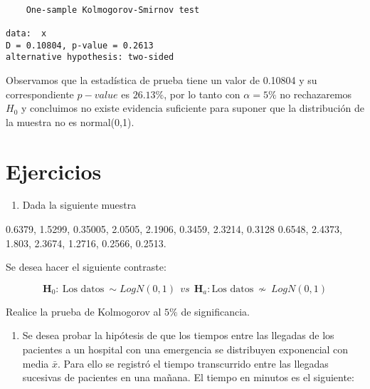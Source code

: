 \documentclass[
  a4paper,
  oneside,
  openany]{book}
\newenvironment{Shaded}{\begin{snugshade}}{\end{snugshade}}
\newcommand{\DecValTok}[1]{\textcolor[rgb]{0.00,0.00,0.81}{#1}}
\newcommand{\FunctionTok}[1]{\textcolor[rgb]{0.00,0.00,0.00}{#1}}
\newcommand{\NormalTok}[1]{#1}
\newcommand{\OtherTok}[1]{\textcolor[rgb]{0.56,0.35,0.01}{#1}}
\newcommand{\SpecialCharTok}[1]{\textcolor[rgb]{0.00,0.00,0.00}{#1}}
\newcommand{\StringTok}[1]{\textcolor[rgb]{0.31,0.60,0.02}{#1}}
\providecommand{\tightlist}{%
  \setlength{\itemsep}{0pt}\setlength{\parskip}{0pt}}
\begin{document}
\begin{Shaded}
\end{Shaded}

\begin{verbatim}

    One-sample Kolmogorov-Smirnov test

data:  x
D = 0.10804, p-value = 0.2613
alternative hypothesis: two-sided
\end{verbatim}

Observamos que la estadística de prueba tiene un valor de 0.10804 y su correspondiente \(p-value\) es \(26.13\%\), por lo tanto con \(\alpha=5\%\) no rechazaremos \(H_0\) y concluimos no existe evidencia suficiente para suponer que la distribución de la muestra no es normal(0,1).

\hypertarget{ejercicios-11}{%
\section{Ejercicios}\label{ejercicios-11}}

\begin{enumerate}
\def\labelenumi{\arabic{enumi}.}
\tightlist
\item
  Dada la siguiente muestra
\end{enumerate}

0.6379, 1.5299, 0.35005, 2.0505, 2.1906, 0.3459, 2.3214, 0.3128
0.6548, 2.4373, 1.803, 2.3674, 1.2716, 0.2566, 0.2513.

Se desea hacer el siguiente contraste:

\[\textbf{H}_0: \ \mbox{Los datos} \ \sim LogN(0,1) \ \ vs \ \ \textbf{H}_a: \mbox{Los datos} \  \nsim \ LogN(0,1)\]

Realice la prueba de Kolmogorov al \(5\%\) de significancia.

\begin{enumerate}
\def\labelenumi{\arabic{enumi}.}
\setcounter{enumi}{1}
\tightlist
\item
  Se desea probar la hipótesis de que los tiempos entre las llegadas de los pacientes a un hospital con una emergencia se distribuyen exponencial con media \(\bar{x}\). Para ello se registró el tiempo transcurrido entre las llegadas sucesivas de pacientes en una mañana. El tiempo en minutos es el siguiente:
\end{enumerate}
\end{document}
